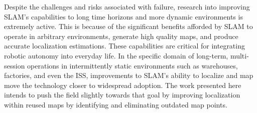 
Despite the challenges and risks associated with failure, research into improving SLAM's capabilities to long time horizons and more dynamic environments is extremely active. This is because of the significant benefits afforded by SLAM to operate in arbitrary environments, generate high quality maps, and produce accurate localization estimations. These capabilities are critical for integrating robotic autonomy into everyday life. In the specific domain of long-term, multi-session operations in intermittently static environments such as warehouses, factories, and even the ISS, improvements to SLAM's ability to localize and map move the technology closer to widespread adoption.  The work presented here intends to push the field slightly towards that goal by improving localization within reused maps by identifying and eliminating outdated map points.